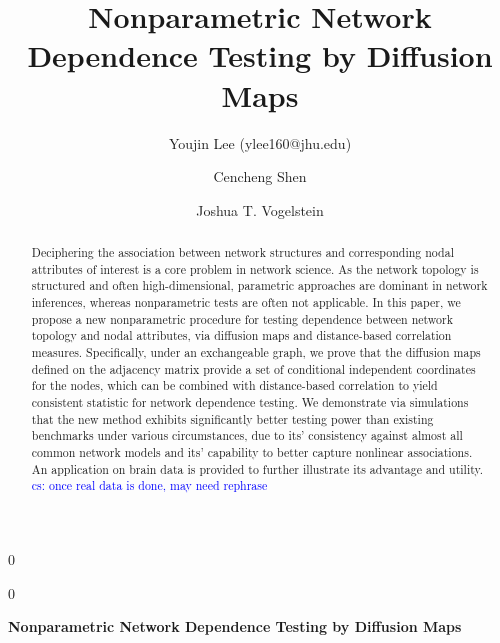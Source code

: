 \documentclass[11pt]{article}
\theoremstyle{definition}
\newcommand{\blind}{0}
\newcommand{\cs}[1]{\textcolor{blue}{cs: #1}}
\begin{document}
	
	\def\spacingset#1{\renewcommand{\baselinestretch}%
		{#1}\small\normalsize} \spacingset{1}
	
	\title{\bf Nonparametric Network Dependence Testing by Diffusion Maps}
	\blind
	{\author[1]{Youjin Lee (ylee160@jhu.edu)} %
		\author[2]{Cencheng Shen} %
		\author[2,3,4]{Joshua T. Vogelstein}
		\date{}
		\maketitle
	} \fi
	
	\blind
	{
		\bigskip
		\bigskip
		\bigskip
		\begin{center}
			{\LARGE\bf Nonparametric Network Dependence Testing by Diffusion Maps}
		\end{center}
		\medskip
	} \fi
	
	\begin{abstract}
		Deciphering the association between network structures and corresponding nodal attributes of interest is a core problem in network science. As the network topology is structured and often high-dimensional, parametric approaches are dominant in network inferences, whereas nonparametric tests are often not applicable. In this paper, we propose a new nonparametric procedure for testing dependence between network topology and nodal attributes, via diffusion maps and distance-based correlation measures. Specifically, under an exchangeable graph, we prove that the diffusion maps defined on the adjacency matrix provide a set of conditional independent coordinates for the nodes, which can be combined with distance-based correlation to yield consistent statistic for network dependence testing. We demonstrate via simulations that the new method exhibits significantly better testing power than existing benchmarks under various circumstances, due to its' consistency against almost all common network models and its' capability to better capture nonlinear associations. An application on brain data is provided to further illustrate its advantage and utility. \cs{once real data is done, may need rephrase}
	\end{abstract}
	
\end{document}
